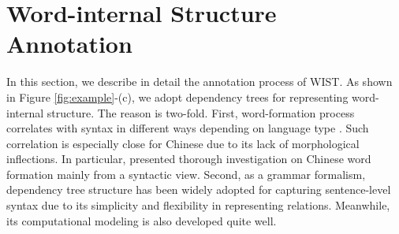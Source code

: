 

\section{Word-internal Structure Annotation}\label{sec:data-annotation}

In this section, we describe in detail the annotation process of WIST. 
As shown in Figure \ref{fig:example}-(c), we adopt dependency trees for representing word-internal structure. 
The reason is two-fold. First, word-formation process correlates with syntax in different ways depending on language type \cite{Aikhenvald-2007-typological}. Such correlation is especially close for Chinese due to its lack of morphological inflections. In particular, \citet{grammar-notes-zhu-1982} presented thorough  investigation on Chinese word formation mainly from a syntactic view. 
Second, as a grammar formalism, dependency tree structure has been widely adopted for capturing sentence-level syntax due to its simplicity and flexibility in representing  relations. Meanwhile, its computational modeling is also developed quite well. 







